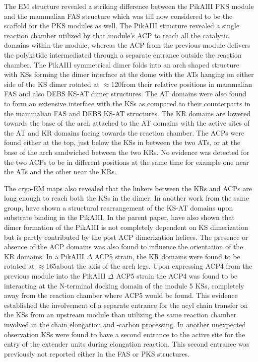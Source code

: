 		The EM structure revealed a striking difference between the PikAIII PKS module and the mammalian FAS structure which was till now considered to be the scaffold for the PKS modules as well. The PikAIII structure revealed a single reaction chamber utilized by that module's ACP to reach all the catalytic domains within the module, whereas the ACP from the previous module delivers the polyketide intermediated through a separate entrance outside the reaction chamber. The PikAIII symmetrical dimer folds into an arch shaped structure with KSs forming the dimer interface at the dome with the ATs hanging on either side of the KS dimer rotated at $ \approx $120\textdegree from their relative positions in mammalian FAS and also DEBS KS-AT dimer structures. The AT domains were also found to form an extensive interface with the KSs as compared to their counterparts in the mammalian FAS and DEBS KS-AT structures. The KR domains are lowered towards the base of the arch attached to the AT domains with the active sites of the AT and KR domains facing towards the reaction chamber. The ACPs were found either at the top, just below the KSs in between the two ATs, or at the base of the arch sandwiched between the two KRs. No evidence was detected for the two ACPs to be in different positions at the same time for example one near the ATs and the other near the KRs. 
		
		The cryo-EM maps also revealed that the linkers between the KRs and ACPs are long enough to reach both the KSs in the dimer. In another work from the same group, \textcite{Whicher2014} have shown a structural rearrangement of the KS-AT domains upon substrate binding in the PikAIII. In the parent paper,   \textcite{Dutta2014} have also shown that dimer formation of the PikAIII is not completely dependent on KS dimerization but is partly contributed by the post ACP dimerization helices. The presence or absence of the ACP domains was also found to  influence the orientation of the KR domains. In a PikAIII $ \Delta $ ACP5 strain, the KR domains were found to be rotated at $ \approx $165\textdegree about the axis of the arch legs. Upon expressing ACP4 from the previous module into the PikAIII $ \Delta $ ACP5 strain the ACP4 was found to be interacting at the N-terminal docking domain of the module 5 KSs, completely away from the reaction chamber where ACP5 would be found. This evidence established the involvement of a separate entrance for the acyl chain transfer on the KSs from an upstream module than utilizing the same reaction chamber involved in the chain elongation and \bet-carbon processing. In another unexpected observation KSs were found to have a second entrance to the active site for the entry of the extender units during elongation reaction. This second entrance was previously not reported either in the FAS or PKS structures. 
		
